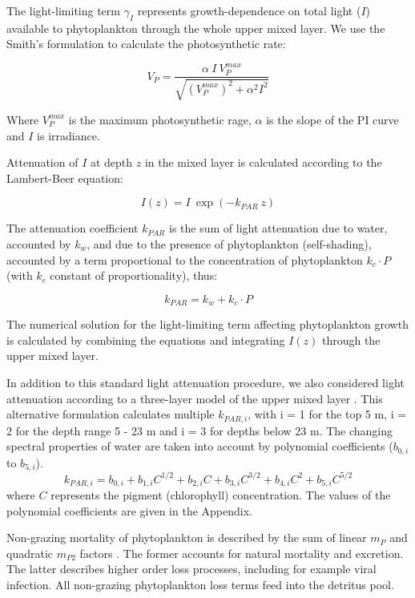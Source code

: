 \documentclass[journal abbreviation, manuscript]{copernicus}
\begin{document}
The light-limiting term $\gamma_{I}$ represents growth-dependence on total light ($I$) available to phytoplankton through the whole upper mixed layer. We use the Smith's formulation to calculate the photosynthetic rate:

\begin{equation}
    V_P = \frac{\alpha ~ I ~ V_P^{max}}{\sqrt{(V_P^{max})^2 + \alpha^2 I^2}}
\end{equation}

Where $V_P^{max}$ is the maximum photosynthetic rage, $\alpha$ is the slope of the PI curve and $I$ is irradiance.

Attenuation of $I$ at depth $z$ in the mixed layer is calculated according to the Lambert-Beer equation:

\begin{equation}
    I(z) = I \ \exp{(-k_{PAR} \ z)}
\end{equation}

The attenuation coefficient $k_{PAR}$ is the sum of light attenuation due to water, accounted by $k_w$, and due to the presence of phytoplankton (self-shading), accounted by a term proportional to the concentration of phytoplankton $k_c \cdot P$ (with $k_c$ constant of proportionality), thus:

\begin{equation}
    k_{PAR} = k_w + k_c \cdot P
\end{equation}

The numerical solution for the light-limiting term affecting phytoplankton growth is calculated by combining the equations and integrating $I(z)$ through the upper mixed layer.

In addition to this standard light attenuation procedure, we also considered light attenuation according to a three-layer model of the upper mixed layer  \citep{Anderson1993APhotosynthesis}. This alternative formulation calculates multiple $k_{PAR, i}$, with i = 1 for the top 5 \unit{m}, i = 2 for the depth range 5 - 23 \unit{m} and i = 3 for depths below 23 \unit{m}. The changing spectral properties of water are taken into account by polynomial coefficients ($b_{0,i}$ to $b_{5,i}$).
\begin{equation}
    k_{PAR, i} = b_{0,i} + b_{1,i} C^{1/2} + b_{2,i} C + b_{3,i} C^{3/2} + b_{4,i} C^2 + b_{5,i} C^{5/2}
\end{equation}
where $C$ represents the pigment (chlorophyll) concentration. The values of the polynomial coefficients are given in the Appendix.

Non-grazing mortality of phytoplankton is described by the sum of linear $m_P$ and quadratic $m_{P2}$ factors \citep{Yool2011Medusa-1.0:Domain}. The former accounts for natural mortality and excretion. The latter describes higher order loss processes, including for example viral infection. All non-grazing phytoplankton loss terms feed into the detritus pool.
\end{document}
